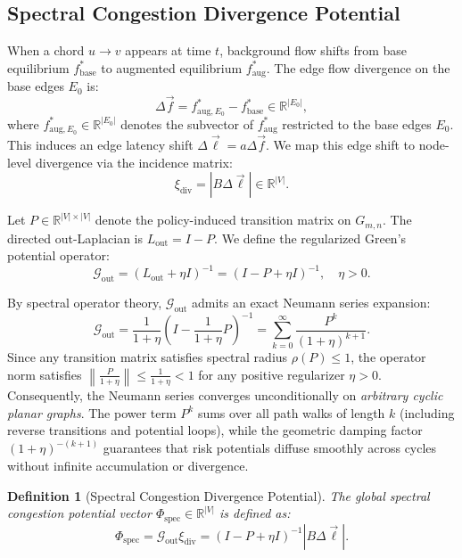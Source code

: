 \documentclass[11pt,a4paper]{article}
\newtheorem{definition}{Definition}
\begin{document}
\subsection{Spectral Congestion Divergence Potential}
When a chord $u \to v$ appears at time $t$, background flow shifts from base equilibrium $f_{\text{base}}^*$ to augmented equilibrium $f_{\text{aug}}^*$. The edge flow divergence on the base edges $E_0$ is:
\begin{equation}
\Delta \vec{f} = f_{\text{aug}, E_0}^* - f_{\text{base}}^* \in \mathbb{R}^{|E_0|},
\end{equation}
where $f_{\text{aug}, E_0}^* \in \mathbb{R}^{|E_0|}$ denotes the subvector of $f_{\text{aug}}^*$ restricted to the base edges $E_0$. This induces an edge latency shift $\Delta \vec{\ell} = a \Delta \vec{f}$. We map this edge shift to node-level divergence via the incidence matrix:
\begin{equation}
\xi_{\text{div}} = |B \Delta \vec{\ell}| \in \mathbb{R}^{|V|}.
\end{equation}

Let $P \in \mathbb{R}^{|V| \times |V|}$ denote the policy-induced transition matrix on $G_{m,n}$. The directed out-Laplacian is $L_{\text{out}} = I - P$. We define the regularized Green's potential operator:
\begin{equation}
\mathcal{G}_{\text{out}} = (L_{\text{out}} + \eta I)^{-1} = (I - P + \eta I)^{-1}, \quad \eta > 0.
\end{equation}

By spectral operator theory, $\mathcal{G}_{\text{out}}$ admits an exact Neumann series expansion:
\begin{equation}
\label{eq:neumann_series}
\mathcal{G}_{\text{out}} = \frac{1}{1 + \eta} \left( I - \frac{1}{1 + \eta} P \right)^{-1} = \sum_{k=0}^{\infty} \frac{P^k}{(1 + \eta)^{k+1}}.
\end{equation}
Since any transition matrix satisfies spectral radius $\rho(P) \le 1$, the operator norm satisfies $\left\| \frac{P}{1 + \eta} \right\| \le \frac{1}{1 + \eta} < 1$ for any positive regularizer $\eta > 0$. Consequently, the Neumann series converges unconditionally on \textit{arbitrary cyclic planar graphs}. The power term $P^k$ sums over all path walks of length $k$ (including reverse transitions and potential loops), while the geometric damping factor $(1 + \eta)^{-(k+1)}$ guarantees that risk potentials diffuse smoothly across cycles without infinite accumulation or divergence.

\begin{definition}[Spectral Congestion Divergence Potential]
The global spectral congestion potential vector $\Phi_{\text{spec}} \in \mathbb{R}^{|V|}$ is defined as:
\begin{equation}
\Phi_{\text{spec}} = \mathcal{G}_{\text{out}} \xi_{\text{div}} = (I - P + \eta I)^{-1} |B \Delta \vec{\ell}|.
\end{equation}
\end{definition}
\end{document}
